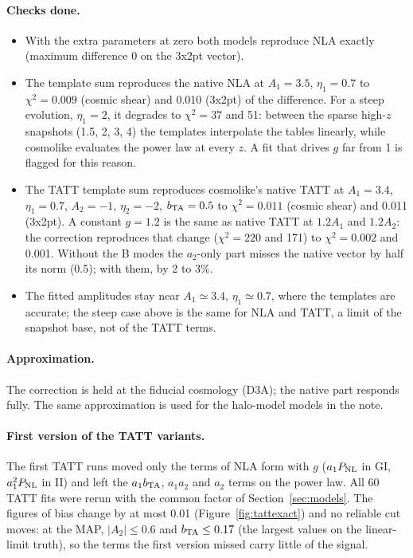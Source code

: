 \documentclass[11pt]{article}
\newcommand{\TplCs}{0.009}
\newcommand{\TplTx}{0.010}
\newcommand{\TplSteepCs}{37}
\newcommand{\TplSteepTx}{51}
\newcommand{\TattTplCs}{0.011}
\newcommand{\TattTplTx}{0.011}
\newcommand{\TattGChgCs}{220}
\newcommand{\TattGChgTx}{171}
\newcommand{\TattGErrCs}{0.002}
\newcommand{\TattGErrTx}{0.001}
\newcommand{\TattAtwoNoBB}{0.5}   %
\newcommand{\TattDmax}{0.01}
\newcommand{\TattAtwoMax}{0.6}    %
\newcommand{\TattBtaMax}{0.17}    %
\begin{document}
\paragraph{Checks done.}
\begin{itemize}
  \item With the extra parameters at zero both models reproduce NLA exactly
    (maximum difference 0 on the 3x2pt vector).
  \item The template sum reproduces the native NLA at $A_1 = 3.5$,
    $\eta_1 = 0.7$ to $\chi^2 = \TplCs$ (cosmic shear) and \TplTx{} (3x2pt)
    of the difference. For a steep evolution, $\eta_1 = 2$, it degrades to
    $\chi^2 = \TplSteepCs$ and \TplSteepTx: between the sparse high-$z$
    snapshots (1.5, 2, 3, 4) the templates interpolate the tables linearly,
    while cosmolike evaluates the power law at every $z$. A fit that drives
    $g$ far from 1 is flagged for this reason.
  \item The TATT template sum reproduces cosmolike's native TATT at
    $A_1 = 3.4$, $\eta_1 = 0.7$, $A_2 = -1$, $\eta_2 = -2$, $b_{\rm TA} = 0.5$
    to $\chi^2 = \TattTplCs$ (cosmic shear) and \TattTplTx{} (3x2pt). A
    constant $g = 1.2$ is the same as native TATT at $1.2 A_1$ and $1.2 A_2$:
    the correction reproduces that change ($\chi^2 = \TattGChgCs$ and
    \TattGChgTx) to $\chi^2 = \TattGErrCs$ and \TattGErrTx. Without the B modes
    the $a_2$-only part misses the native vector by half its norm
    (\TattAtwoNoBB); with them, by 2 to 3\%.
  \item The fitted amplitudes stay near $A_1 \simeq 3.4$, $\eta_1 \simeq 0.7$,
    where the templates are accurate; the steep case above is the same for
    NLA and TATT, a limit of the snapshot base, not of the TATT terms.
\end{itemize}

\paragraph{Approximation.}
The correction is held at the fiducial cosmology (D3A); the native part
responds fully. The same approximation is used for the halo-model models in
the note.

\paragraph{First version of the TATT variants.}
The first TATT runs moved only the terms of NLA form with $g$ ($a_1 P_{\rm
NL}$ in GI, $a_1^2 P_{\rm NL}$ in II) and left the $a_1 b_{\rm TA}$,
$a_1 a_2$ and $a_2$ terms on the power law. All 60 TATT fits were rerun with
the common factor of Section~\ref{sec:models}. The figures of bias change by
at most \TattDmax{} (Figure~\ref{fig:tattexact}) and no reliable cut moves:
at the MAP, $|A_2| \le \TattAtwoMax$ and $b_{\rm TA} \le \TattBtaMax$
(the largest values on the linear-limit truth), so the terms the first
version missed carry little of the signal.
\end{document}
